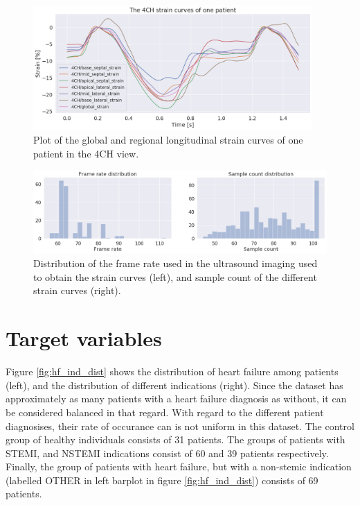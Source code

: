 \begin{figure}[h]
    \begin{center}
    \includegraphics[width=0.95\textwidth]{data-exp/patient_strain_curves_4CH.png}
    \end{center}
    \caption{Plot of the global and regional longitudinal strain curves of one patient in the 4CH view.}
    \label{fig:strain_curves}
\end{figure}

\begin{figure}
    \begin{center}
    \includegraphics[width=\textwidth]{data-exp/fr_sample_dist.png}
    \end{center}
    \caption{Distribution of the frame rate used in the ultrasound imaging used to obtain the strain curves (left), and sample count of the different strain curves (right).}
    \label{fig:fr_sample_dist}
\end{figure}

\newpage

\section{Target variables} \label{sec:target}
Figure \ref{fig:hf_ind_dist} shows the distribution of heart failure among patients (left), and the distribution of different indications (right). 
Since the dataset has approximately as many patients with a heart failure diagnosis as without, it can be considered balanced in that regard. 
With regard to the different patient diagnosises, their rate of occurance can is not uniform in this dataset. 
The control group of healthy individuals consists of 31 patients. 
The groups of patients with STEMI, and NSTEMI indications consist of 60 and 39 patients respectively. 
Finally, the group of patients with heart failure, but with a non-stemic indication (labelled OTHER in left barplot in figure \ref{fig:hf_ind_dist}) consists of 69 patients. \bigskip


